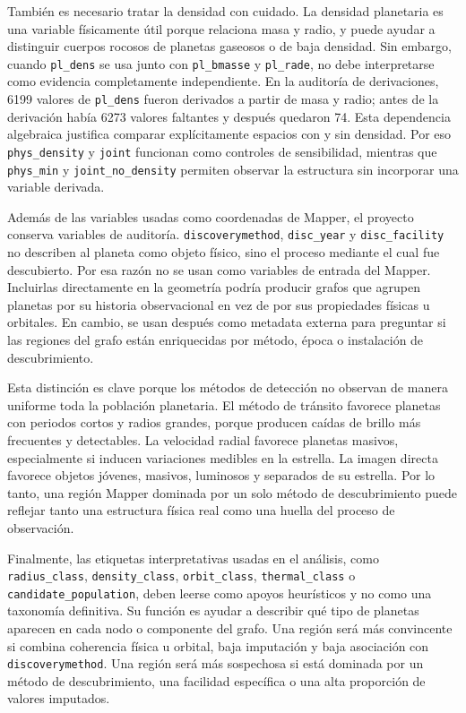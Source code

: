 También es necesario tratar la densidad con cuidado. La densidad planetaria es una variable físicamente útil porque relaciona masa y radio, y puede ayudar a distinguir cuerpos rocosos de planetas gaseosos o de baja densidad. Sin embargo, cuando \texttt{pl\_dens} se usa junto con \texttt{pl\_bmasse} y \texttt{pl\_rade}, no debe interpretarse como evidencia completamente independiente. En la auditoría de derivaciones, 6199 valores de \texttt{pl\_dens} fueron derivados a partir de masa y radio; antes de la derivación había 6273 valores faltantes y después quedaron 74. Esta dependencia algebraica justifica comparar explícitamente espacios con y sin densidad. Por eso \texttt{phys\_density} y \texttt{joint} funcionan como controles de sensibilidad, mientras que \texttt{phys\_min} y \texttt{joint\_no\_density} permiten observar la estructura sin incorporar una variable derivada.

Además de las variables usadas como coordenadas de Mapper, el proyecto conserva variables de auditoría. \texttt{discoverymethod}, \texttt{disc\_year} y \texttt{disc\_facility} no describen al planeta como objeto físico, sino el proceso mediante el cual fue descubierto. Por esa razón no se usan como variables de entrada del Mapper. Incluirlas directamente en la geometría podría producir grafos que agrupen planetas por su historia observacional en vez de por sus propiedades físicas u orbitales. En cambio, se usan después como metadata externa para preguntar si las regiones del grafo están enriquecidas por método, época o instalación de descubrimiento.

Esta distinción es clave porque los métodos de detección no observan de manera uniforme toda la población planetaria. El método de tránsito favorece planetas con periodos cortos y radios grandes, porque producen caídas de brillo más frecuentes y detectables. La velocidad radial favorece planetas masivos, especialmente si inducen variaciones medibles en la estrella. La imagen directa favorece objetos jóvenes, masivos, luminosos y separados de su estrella. Por lo tanto, una región Mapper dominada por un solo método de descubrimiento puede reflejar tanto una estructura física real como una huella del proceso de observación.

Finalmente, las etiquetas interpretativas usadas en el análisis, como \texttt{radius\_class}, \texttt{density\_class}, \texttt{orbit\_class}, \texttt{thermal\_class} o \texttt{candidate\_population}, deben leerse como apoyos heurísticos y no como una taxonomía definitiva. Su función es ayudar a describir qué tipo de planetas aparecen en cada nodo o componente del grafo. Una región será más convincente si combina coherencia física u orbital, baja imputación y baja asociación con \texttt{discoverymethod}. Una región será más sospechosa si está dominada por un método de descubrimiento, una facilidad específica o una alta proporción de valores imputados.